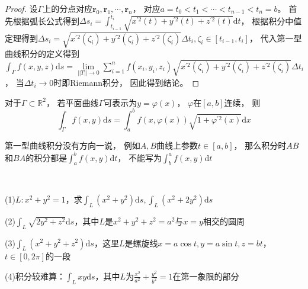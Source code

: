 \begin{proof}
  设$\Gamma$上的分点对应$\mathbf{r}_0,\mathbf{r}_1,\cdots,\mathbf{r}_n$，
  对应$a = t_0 < t_1 <\cdots < t_{n-1} < t_n = b$。
  首先根据弧长公式得到$\Delta s_i = \int ^{t_i}_{t_{i-1}}\sqrt{x^{\prime 2}(t) + y^{\prime 2}(t) + z^{\prime 2}(t)} \mathrm{d}t$，
  根据积分中值定理得到$\Delta s_i = \sqrt{x^{\prime 2}(\zeta_i) + y^{\prime 2}(\zeta_i) + z^{\prime 2}(\zeta_i)} \Delta t_i, \zeta_i \in [t_{i-1},t_i]$，
  代入第一型曲线积分的定义得到$\int _{\Gamma}f(x,y,z)\mathrm{d}s = \lim \limits _{||T|| \rightarrow 0} \sum\limits_{i = 1}^n f(x_i,y_i,z_i) \sqrt{x^{\prime 2}(\zeta_i) + y^{\prime 2}(\zeta_i) + z^{\prime 2}(\zeta_i)} \Delta t_i$，
  当$\Delta t_i \rightarrow 0$时即Riemann积分，
  因此得到结论。
\end{proof}

\begin{corollary}[二维第一型曲线积分的计算]
  对于$\Gamma \subset \mathbb{R}^2$，
  若平面曲线$\Gamma$可表示为$y = \varphi(x)$，
  $\varphi$在$[a,b]$连续，
  则
  \begin{equation*}
    \int _{\Gamma} f(x,y)\mathrm{d}s = \int ^b_a f(x,\varphi(x)) \sqrt{1 + \varphi^{\prime 2}(x)}\mathrm{d}x
  \end{equation*}
\end{corollary}

\begin{note}
  第一型曲线积分没有方向一说，
  例如$A,B$曲线上参数$t \in [a,b]$，
  那么积分时$AB$和$BA$的积分都是$\int_a^bf(x,y) \mathrm{d} t$，
  不能写为$\int_b^a f(x,y) \mathrm{d} t$
\end{note}

~

\begin{exercise}[极坐标格式]
  (1)$L:x^2 + y^2 = 1$，求$\int_L(x^2 + y^2)\mathrm{d} s, \int_L(x^2 + 2y^2)\mathrm{d} s$

  (2)$\int_L \sqrt{2y^2 + z^2}\mathrm{d} s$，其中$L$是$x^2 + y^2 + z^2 = a^2$与$x = y$相交的圆周

  (3)$\int_L (x^2 + y^2 + z^2)\mathrm{d} s$，这里$L$是螺旋线$x = a \cos t, y = a \sin t, z = bt$，
  $t \in [0,2\pi]$的一段

  (4)积分较难算：$\int_L xy \mathrm{d} s$，其中$L$为$\frac{x^2}{a^2} + \frac{y^2}{b^2} = 1$在第一象限的部分
\end{exercise}

